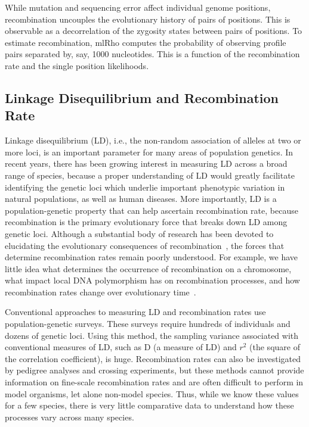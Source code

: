 \documentclass{sig-alternate}
\begin{document}
While mutation and sequencing error affect individual genome positions, recombination uncouples the
evolutionary history of pairs of positions. This is observable as a decorrelation of the zygosity states between
pairs of positions. To estimate recombination, mlRho computes the probability of observing profile pairs
separated by, say, 1000 nucleotides. This is a function of the recombination rate and the single position
likelihoods.

\subsection{Linkage Disequilibrium and Recombination Rate}\label{sec:LD}
Linkage disequilibrium (LD), i.e., the non-random association of alleles at two or more loci, is an important
parameter for many areas of population genetics.  In recent years, there has been growing interest in
measuring LD across a broad range of species, because a proper understanding of LD would greatly facilitate
identifying the genetic loci which underlie important phenotypic variation in natural populations, as well as
human diseases. More importantly, LD is a population-genetic property that can help ascertain recombination
rate, because recombination is the primary evolutionary force that breaks down LD among genetic loci. Although
a substantial body of research has been devoted to elucidating the evolutionary consequences of
recombination~\cite{resolving-paradox}, the forces that determine recombination rates remain poorly
understood. For example, we have little idea what determines the occurrence of recombination on a chromosome,
what impact local DNA polymorphism has on recombination processes, and how recombination rates change over
evolutionary time~\cite{stumpf}.

Conventional approaches to measuring LD and recombination rates use population-genetic surveys. These surveys
require hundreds of individuals and dozens of genetic loci. Using this method, the sampling variance
associated with conventional measures of LD, such as D (a measure of LD) and $r^2$ (the square of the
correlation coefficient), is huge. Recombination rates can also be investigated by pedigree analyses and crossing experiments,
but these methods cannot provide information on fine-scale recombination rates and are often difficult to
perform in model organisms, let alone non-model species. Thus, while we know these values for a few
species, there is very little comparative data to understand how these processes vary across many species.
\end{document}
